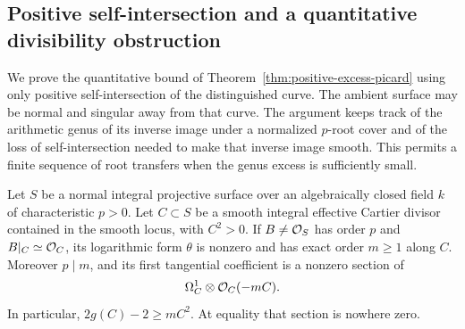 \subsection{Positive self-intersection and a quantitative divisibility obstruction}
\label{subsec:positive-square-picard}

We prove the quantitative bound of Theorem~\ref{thm:positive-excess-picard}
using only positive
self-intersection of the distinguished curve. The ambient surface may
be normal and singular away from that curve. The argument keeps track
of the arithmetic genus of its inverse image under a normalized
$p$-root cover and of the loss of self-intersection needed to make that
inverse image smooth. This permits a finite sequence of root transfers
when the genus excess is sufficiently small.

\begin{lemma}\label{lem:positive-square-logarithmic}
Let $S$ be a normal integral projective surface over an algebraically
closed field $k$ of characteristic $p>0$. Let $C\subset S$ be a smooth
integral effective Cartier divisor contained in the smooth locus, with
$C^2>0$. If $B\ne\mathcal O_S$ has order $p$ and $B|_C\simeq\mathcal O_C$, its
logarithmic form $\theta$ is nonzero and has exact order $m\geq1$ along
$C$. Moreover $p\mid m$, and its first tangential coefficient is a
nonzero section of
\[
 \Omega_C^1\otimes\mathcal O_C(-mC).
\]
In particular, $2g(C)-2\geq mC^2$. At equality that section is nowhere
zero.
\end{lemma}

